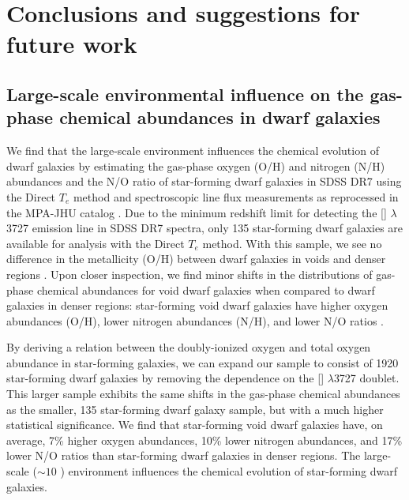 \chapter[Conclusion]{Conclusions and suggestions for future work}\label{ch:conclusion}

\section[Chemical abundances]{Large-scale environmental influence on the gas-phase chemical abundances in dwarf galaxies}
We find that the large-scale environment influences the chemical evolution of 
dwarf galaxies by estimating the gas-phase oxygen (O/H) and nitrogen (N/H) 
abundances and the N/O ratio of star-forming dwarf galaxies in SDSS DR7 using 
the Direct $T_e$ method and spectroscopic line flux measurements as reprocessed 
in the MPA-JHU catalog \citep[Douglass et al., 2017, in prep]{Douglass17a,
Douglass17b}.  Due to the minimum redshift limit for detecting the [] 
$\lambda$3727 emission line in SDSS DR7 spectra, only 135 star-forming dwarf 
galaxies are available for analysis with the Direct $T_e$ method.  With this 
sample, we see no difference in the metallicity (O/H) between dwarf galaxies in 
voids and denser regions \citep{Douglass17a}.  Upon closer inspection, we find 
minor shifts in the distributions of gas-phase chemical abundances for void 
dwarf galaxies when compared to dwarf galaxies in denser regions: star-forming 
void dwarf galaxies have higher oxygen abundances (O/H), lower nitrogen 
abundances (N/H), and lower N/O ratios \citep{Douglass17b}.

By deriving a relation between the doubly-ionized oxygen and total oxygen 
abundance in star-forming galaxies, we can expand our sample to consist of 1920 
star-forming dwarf galaxies by removing the dependence on the [] 
$\lambda$3727 doublet.  This larger sample exhibits the same shifts in the 
gas-phase chemical abundances as the smaller, 135 star-forming dwarf galaxy 
sample, but with a much higher statistical significance.  We find that 
star-forming void dwarf galaxies have, on average, 7\% higher oxygen abundances, 
10\% lower nitrogen abundances, and 17\% lower N/O ratios than star-forming 
dwarf galaxies in denser regions.  The large-scale ($\sim 10$ \hMpc) environment 
influences the chemical evolution of star-forming dwarf galaxies.

